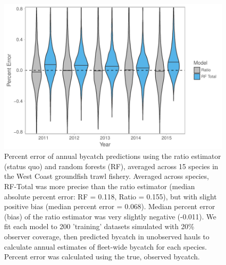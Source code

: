 \documentclass[]{article}
\begin{document}
\begin{figure}

{\centering \includegraphics[width=6in]{bycatch_sim_paper_files/figure-latex/model-comparison-byyear-1} 

}

\caption{Percent error of annual bycatch predictions using the ratio estimator (status quo) and random forests (RF), averaged across 15 species in the West Coast groundfish trawl fishery. Averaged across species, RF-Total was more precise than the ratio estimator (median absolute percent error: RF = 0.118, Ratio = 0.155), but with slight positive bias (median percent error = 0.068). Median percent error (bias) of the ratio estimator was very slightly negative (-0.011). We fit each model to 200 'training' datasets simulated with 20\% observer coverage, then predicted bycatch in unobserved hauls to calculate annual estimates of fleet-wide bycatch for each species. Percent error was calculated using the true, observed bycatch.}\label{fig:model-comparison-byyear}
\end{figure}

\pagebreak
\end{document}
